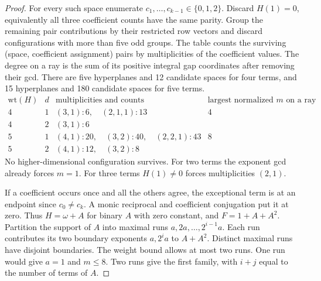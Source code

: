 \documentclass[11pt]{article}
\begin{document}
\begin{proof}
For every such space enumerate \(c_1,\ldots,c_{k-1}\in\{0,1,2\}\).
Discard \(H(1)=0\), equivalently all three coefficient counts have the
same parity. Group the remaining pair contributions by their restricted
row vectors and discard configurations with more than five odd groups.
The table counts the surviving (space, coefficient assignment) pairs
by multiplicities of the coefficient values. The degree on a ray is
the sum of its positive integral gap coordinates after removing their
gcd. There are five hyperplanes and 12 candidate spaces for four
terms, and 15 hyperplanes and 180 candidate spaces for five terms.
\[
\begin{array}{c|c|l|c}
 \mathrm{wt}(H)&d&\text{multiplicities and counts}&
   \text{largest normalized }m\text{ on a ray}\\\hline
 4&1&(3,1):6,\quad (2,1,1):13&4\\
 4&2&(3,1):6&\\
 5&1&(4,1):20,\quad (3,2):40,\quad (2,2,1):43&8\\
 5&2&(4,1):12,\quad (3,2):8&
\end{array}
\]
No higher-dimensional configuration survives. For two terms the
exponent gcd already forces \(m=1\). For three terms \(H(1)\ne0\)
forces multiplicities \((2,1)\).

If a coefficient occurs once and all the others agree, the exceptional
term is at an endpoint since \(c_0\ne c_k\). A monic reciprocal and
coefficient conjugation put it at zero. Thus \(H=\omega+A\) for binary
\(A\) with zero constant, and \(F=1+A+A^2\). Partition the support of
\(A\) into maximal runs \(a,2a,\ldots,2^{i-1}a\). Each run contributes
its two boundary exponents \(a,2^ia\) to \(A+A^2\). Distinct maximal
runs have disjoint boundaries. The weight bound allows at most two
runs. One run would give \(a=1\) and \(m\le8\). Two runs give the
first family, with \(i+j\) equal to the number of terms of \(A\).


\end{proof}
\end{document}
